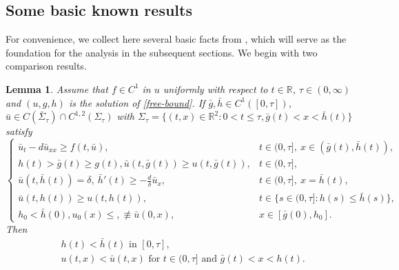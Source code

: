 \documentclass[11pt]{amsart}
\newtheorem{lemma}[theorem]{Lemma}
\numberwithin{equation}{section}
\begin{document}
 \subsection{Some basic known results}
 For convenience, we collect here several basic facts  from \cite{MDW}, which will serve as the foundation for the analysis in the subsequent sections. We begin with two  comparison results.


 \begin{lemma}{\rm\cite[Lemma 2.2]{MDW}\label{lem-comp}}
  Assume that  $f\in C^1$ in $u$ uniformly with respect to $t\in \mathbb R$, $\tau\in(0,\infty)$ and   $(u,g,h)$ is the solution of \eqref{free-bound}. If  $\bar{g},\bar{h}\in C^1([0,\tau])$, $\bar{u}\in C(\bar{\Sigma}_\tau)\cap C^{1,2}( \Sigma_\tau)$ with $\Sigma_\tau=\{(t,x)\in\mathbb{R}^2:0<t\leq \tau,\bar{g}(t)< x<\bar{h}(t)\}$ satisfy 
 \begin{equation}\label{eq-com}
   \begin{cases}
     \bar{u}_t-d\bar{u}_{xx}\geq f(t,\bar{u}), &t\in (0, \tau],\ x\in ( \bar{g}(t), \bar{h}(t)),\\
    h(t)>\bar{g}(t)\geq g(t),   \bar{u}(t,\bar{g}(t))\geq u(t,\bar{g}(t)), &t\in (0,\tau],\\
    \bar{u}(t,\bar{h}(t))=\delta,~ \bar{h}'(t)\geq -\frac{d}{\delta}\bar{u}_x,&t\in (0, \tau],\ x=\bar{h}(t),\\
    \bar{u}(t,h(t))\geq u(t,h(t)), & t\in\{s\in (0, \tau]: h(s)\leq \bar{h}(s)\},\\
    h_0<\bar{h}(0),u_0(x)\leq,\not\equiv  \bar{u}(0,x),&x\in[\bar{g}(0),h_0].
   \end{cases}
 \end{equation}
 Then
 \begin{align*}
   &h(t)<\bar{h}(t)\text{ in }[0,\tau],\\
   &u(t,x)< \bar{u}(t,x)\text{ for }t\in(0,\tau] \text{ and }\bar{g}(t)<x<h(t).
 \end{align*}
 \end{lemma}
\end{document}
